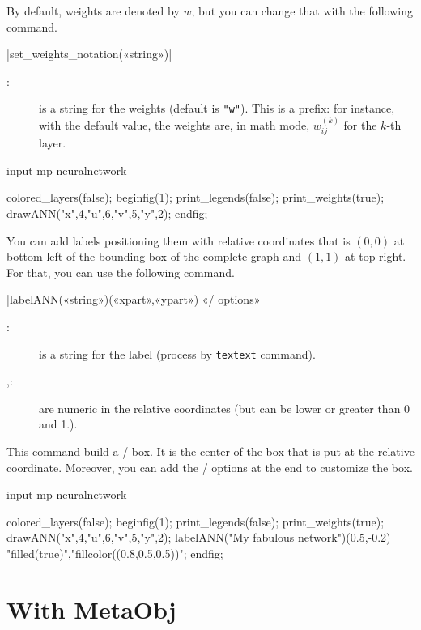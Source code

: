 \documentclass[english]{ltxdoc}
\begin{document}
By default, weights are denoted by $w$, but you can change that with the
following command.


\commande|set_weights_notation(«string»)|\smallskip{}
\begin{description}
  \item[:] is a string for the weights (default is
  \lstinline+"w"+). 
  This is a prefix: for instance, with the default value, the weights are, in
  math mode, $w_{ij}^{(k)}$ for the $k$-th layer.  
\end{description}



\begin{ExempleMP}
input mp-neuralnetwork

colored_layers(false);
beginfig(1);
print_legends(false);
print_weights(true);
drawANN("x",4,"u",6,"v",5,"y",2);
endfig;
\end{ExempleMP}
  
You can add labels positioning them with relative coordinates that is $(0,0)$ at
bottom left of the bounding box of the complete graph and $(1,1)$ at top right. 
For that, you can use the following command. 

\commande|labelANN(«string»)(«xpart»,«ypart») «\MO/ options»|\smallskip{}
\begin{description}
  \item[:] is a string for the label (process by
  \lstinline+textext+ command).
  \item[,:] are numeric in the relative coordinates (but
  can be lower or greater than 0 and 1.).  
\end{description}

This command build a \MO/ box. It is the center of the box that is put at the
relative coordinate. Moreover, you can add the \MO/ options at the end to
customize the box. 

\begin{ExempleMP}
input mp-neuralnetwork

colored_layers(false);
beginfig(1);
print_legends(false);
print_weights(true);
drawANN("x",4,"u",6,"v",5,"y",2);
labelANN("My fabulous network")(0.5,-0.2) "filled(true)","fillcolor((0.8,0.5,0.5))";
endfig;
\end{ExempleMP}
  



\section{With MetaObj}\label{sec:mo}
\end{document}
